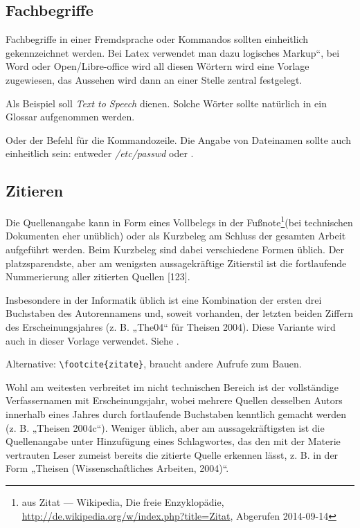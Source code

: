 \subsection{Fachbegriffe}

Fachbegriffe in einer Fremdsprache oder Kommandos sollten einheitlich
gekennzeichnet werden. Bei Latex verwendet man dazu \quotedblbase logisches
Markup``, bei Word oder Open/Libre-office wird all diesen Wörtern
wird eine Vorlage zugewiesen, das Aussehen wird dann an einer Stelle
zentral festgelegt.

Als Beispiel soll \emph{Text to Speech}
dienen. Solche Wörter sollte natürlich in ein Glossar aufgenommen
werden.

Oder der Befehl  für die Kommandozeile. Die Angabe von
Dateinamen sollte auch einheitlich sein: entweder \emph{/etc/passwd}
oder .


\subsection{Zitieren}

Die Quellenangabe kann in Form eines Vollbelegs in der Fußnote\footnote{aus Zitat --- Wikipedia, Die freie Enzyklopädie, \url{http://de.wikipedia.org/w/index.php?title=Zitat},
Abgerufen 2014-09-14}(bei technischen Dokumenten eher unüblich) oder als Kurzbeleg am Schluss
der gesamten Arbeit aufgeführt werden. Beim Kurzbeleg sind dabei verschiedene
Formen üblich. Der platzsparendste, aber am wenigsten aussagekräftige
Zitierstil ist die fortlaufende Nummerierung aller zitierten Quellen
{[}123{]}.


Insbesondere in der Informatik üblich ist eine Kombination der ersten drei Buchstaben
des Autorennamens und, soweit vorhanden, der letzten beiden Ziffern des Erscheinungsjahres
(z. B. „The04“ für Theisen 2004). Diese Variante wird auch in dieser Vorlage verwendet.
Siehe \cite{zitate}.

Alternative: \verb+\footcite{zitate}+, braucht andere Aufrufe zum Bauen.

Wohl am weitesten verbreitet im nicht technischen Bereich ist
der vollständige Verfassernamen mit Erscheinungsjahr, wobei mehrere
Quellen desselben Autors innerhalb eines Jahres durch fortlaufende
Buchstaben kenntlich gemacht werden (z. B. „Theisen 2004c“). Weniger
üblich, aber am aussagekräftigsten ist die Quellenangabe unter Hinzufügung
eines Schlagwortes, das den mit der Materie vertrauten Leser zumeist
bereits die zitierte Quelle erkennen lässt, z. B. in der Form „Theisen
(Wissenschaftliches Arbeiten, 2004)“.

